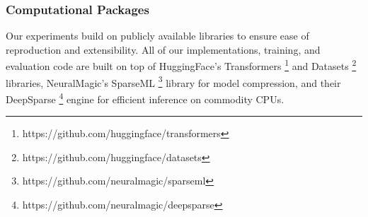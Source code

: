 \documentclass[11pt]{article}
\begin{document}
\subsubsection{Computational Packages}
Our experiments build on publicly available libraries to ensure ease of reproduction and extensibility. All of our implementations, training, and evaluation code are built on top of HuggingFace's Transformers \footnote{https://github.com/huggingface/transformers} and Datasets \footnote{https://github.com/huggingface/datasets} libraries, NeuralMagic's SparseML \footnote{https://github.com/neuralmagic/sparseml} library for model compression, and their DeepSparse \footnote{https://github.com/neuralmagic/deepsparse} engine for efficient inference on commodity CPUs.
\end{document}
